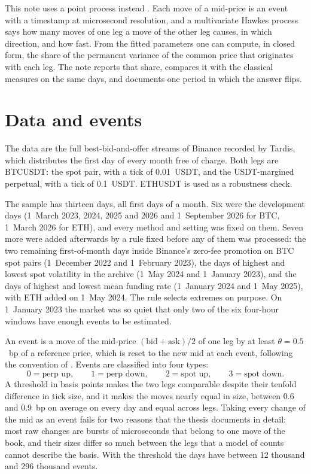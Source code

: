 \documentclass[a4paper,11pt]{article}
\begin{document}
This note uses a point process instead \cite{hawkes1971, bacry2015}. Each move of a mid-price is an event with a timestamp at microsecond resolution, and a multivariate Hawkes process says how many moves of one leg a move of the other leg causes, in which direction, and how fast. From the fitted parameters one can compute, in closed form, the share of the permanent variance of the common price that originates with each leg. The note reports that share, compares it with the classical measures on the same days, and documents one period in which the answer flips.

\section{Data and events}

The data are the full best-bid-and-offer streams of Binance recorded by Tardis, which distributes the first day of every month free of charge. Both legs are BTCUSDT: the spot pair, with a tick of 0.01~USDT, and the USDT-margined perpetual, with a tick of 0.1~USDT. ETHUSDT is used as a robustness check.

The sample has thirteen days, all first days of a month. Six were the development days (1~March 2023, 2024, 2025 and 2026 and 1~September 2026 for BTC, 1~March 2026 for ETH), and every method and setting was fixed on them. Seven more were added afterwards by a rule fixed before any of them was processed: the two remaining first-of-month days inside Binance's zero-fee promotion on BTC spot pairs (1~December 2022 and 1~February 2023), the days of highest and lowest spot volatility in the archive (1~May 2024 and 1~January 2023), and the days of highest and lowest mean funding rate (1~January 2024 and 1~May 2025), with ETH added on 1~May 2024. The rule selects extremes on purpose. On 1~January 2023 the market was so quiet that only two of the six four-hour windows have enough events to be estimated.

An event is a move of the mid-price $(\text{bid}+\text{ask})/2$ of one leg by at least $\theta = 0.5$~bp of a reference price, which is reset to the new mid at each event, following the convention of \cite{bacry2013}. Events are classified into four types:
\begin{equation*}
0 = \text{perp up},\qquad 1 = \text{perp down},\qquad 2 = \text{spot up},\qquad 3 = \text{spot down}.
\end{equation*}
A threshold in basis points makes the two legs comparable despite their tenfold difference in tick size, and it makes the moves nearly equal in size, between 0.6 and 0.9~bp on average on every day and equal across legs. Taking every change of the mid as an event fails for two reasons that the thesis documents in detail: most raw changes are bursts of microseconds that belong to one move of the book, and their sizes differ so much between the legs that a model of counts cannot describe the basis. With the threshold the days have between 12 thousand and 296 thousand events.
\end{document}

